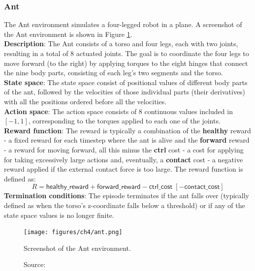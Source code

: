 \subsubsection{Ant}

The Ant environment \cite{antfarama} simulates a four-legged robot
in a plane. A screenshot of the Ant environment
is shown in Figure \ref{fig:ant}.\\
\textbf{Description}: The Ant consists of a torso and four legs, each with
two joints, resulting in a total of $8$ actuated joints.
The goal is to coordinate the four legs to move forward (to the right)
by applying torques to the eight hinges that connect the nine body parts,
consisting of each leg's two segments and the torso.\\
\textbf{State space}: The state space consist of positional values
of different body parts of the ant, followed by the velocities
of those individual parts (their derivatives)
with all the positions ordered before all the velocities.\\
\textbf{Action space}: The action space consists of $8$ continuous values
included in $[-1, 1]$,
corresponding to the torques applied to each one of the joints.\\
\textbf{Reward function}: The reward is typically a combination
of the \textbf{healthy} reward - a fixed reward for each timestep where
the ant is alive and the \textbf{forward} reward - a reward for moving
forward, all this minus the \textbf{ctrl} cost - a cost for applying
for taking excessively large actions and, eventually, a \textbf{contact}
cost - a negative reward applied if the external contact force is too large.
The reward function is defined as:
\begin{equation}
    R = \textsf{healthy\_reward} + \textsf{forward\_reward} - \textsf{ctrl\_cost} \;[- \textsf{contact\_cost}]
\end{equation}
\textbf{Termination conditions}: The episode terminates
if the ant falls over
(typically defined as when the torso's z-coordinate falls below a threshold)
or if any of the state space values is no longer finite.

\begin{figure}[h]
    \centering
    \texttt{[image: figures/ch4/ant.png]}
    \caption{Screenshot of the Ant environment.}
    \vspace{-10px}
    \caption*{\scriptsize{Source: \cite{antpic}}}
    \label{fig:ant}
\end{figure}

